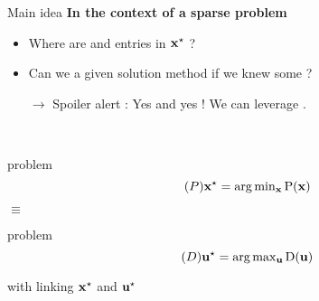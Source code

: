 \documentclass[10pt]{beamer}
\begin{document}
\begin{frame}{Main idea}
  \textbf{In the context of a sparse problem}
  \begin{itemize}
    \pause \item Where are  and  entries in $\mathbf{x}^{\star}$ ?
    \pause \item Can we  a given solution method if we knew some ?
    \pause \item[$\rightarrow$] Spoiler alert : Yes and yes ! We can leverage .
  \end{itemize}
  
  \pause
  ~\\
  \begin{minipage}{0.45\linewidth}
    \begin{block}{ problem}
      \begin{equation}
        \tag{$\ppb$}
        \opt{\pv} = \textstyle\arg\min_{\pv} 
        \pfunc(\pv)
      \end{equation}
    \end{block}
  \end{minipage}
  \hfill
  \begin{minipage}{0.04\linewidth}
    \begin{center}
      \hspace{-0.25cm}
      {\LARGE$\equiv$}
    \end{center}
  \end{minipage}
  \hfill
  \begin{minipage}{0.47\linewidth}
    \begin{block}{ problem}
      \begin{equation}
        \tag{$\dpb$}
        \opt{\dv} = \textstyle\arg\max_{\dv} 
        \dfunc(\dv)
      \end{equation}
    \end{block}
  \end{minipage}
  \begin{center}
    with  linking $\mathbf{x}^{\star}$ and $\mathbf{u}^{\star}$
  \end{center}
\end{frame}
\end{document}
